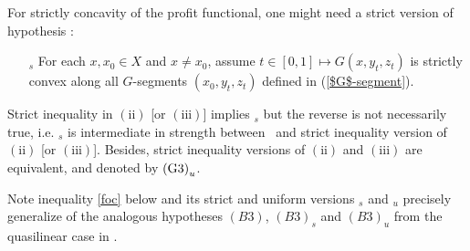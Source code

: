 For strictly concavity of the profit functional, one might need a strict version of hypothesis \Gthree:
\begin{itemize}
\item[\Gthree$_{s}$] For each $x,x_0 \in X$ and $x\ne x_0$, assume $t \in [0,1] \longmapsto G(x, y_t, z_t)$ is strictly convex along all $G$-segments $(x_0, y_t, z_t)$ defined in (\ref{$G$-segment}).
\end{itemize}


\begin{remark}\label{(C5)_s and (C5)_u}
	Strict inequality in $\mathrm{(ii)}$ [or $\mathrm{(iii)}$] implies \Gthree$_{s}$ but the reverse is not necessarily true, i.e. \Gthree$_{s}$ is intermediate in strength between \Gthree\ and strict inequality version of $\mathrm{(ii)}$ [or $\mathrm{(iii)}$]. Besides, strict inequality versions of $\mathrm{(ii)}$ and $\mathrm{(iii)}$ are equivalent, and denoted by ${\rm (G3)}_{u}$.
	
	Note inequality \eqref{foc} below and its strict and uniform versions \Gthree$_{s}$ and \Gthree$_{u}$
	precisely generalize of the analogous hypotheses $(B3)$, $(B3)_{s}$ and $(B3)_{u}$ from the quasilinear case in
	\cite{FigalliKimMcCann11}.
\end{remark}
